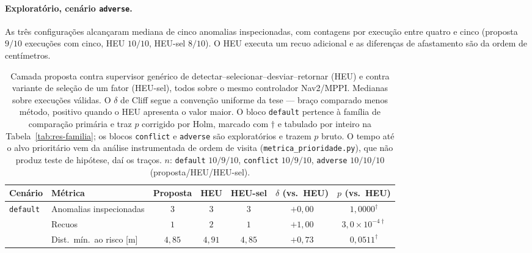 \paragraph*{Exploratório, cenário \texttt{adverse}.}
As três configurações alcançaram mediana de cinco anomalias inspecionadas, com
contagens por execução entre quatro e cinco (proposta $9/10$ execuções com cinco,
HEU $10/10$, HEU-sel $8/10$). O HEU executa um recuo adicional e as diferenças de
afastamento são da ordem de centímetros.

\begin{table}[htb]
\centering
\caption{Camada proposta contra supervisor genérico de
detectar--selecionar--desviar--retornar (HEU) e contra variante de seleção de um
fator (HEU-sel), todos sobre o mesmo controlador Nav2/MPPI. Medianas sobre execuções
válidas. O $\delta$ de Cliff segue a convenção uniforme da tese --- braço comparado
menos método, positivo quando o HEU apresenta o valor maior. O bloco \texttt{default}
pertence à família de comparação primária e traz $p$ corrigido por Holm, marcado com
$\dagger$ e tabulado por inteiro na Tabela~\ref{tab:res-familia}; os blocos
\texttt{conflict} e \texttt{adverse} são exploratórios e trazem $p$ bruto. O tempo
até o alvo prioritário vem da análise instrumentada de ordem de visita
(\texttt{metrica\_prioridade.py}), que não produz teste de hipótese, daí os traços.
$n$: \texttt{default} $10/9/10$, \texttt{conflict} $10/9/10$, \texttt{adverse}
$10/10/10$ (proposta/HEU/HEU-sel).}
\label{tab:res-heu}
\footnotesize
\setlength{\tabcolsep}{4pt}
\begin{tabular}{llccccc}
\hline
\textbf{Cenário} & \textbf{Métrica} & \textbf{Proposta} & \textbf{HEU} &
\textbf{HEU-sel} & \textbf{$\delta$ (vs.\ HEU)} & \textbf{$p$ (vs.\ HEU)}\\
\hline
\texttt{default} & Anomalias inspecionadas    & $3$     & $3$     & $3$     & $+0{,}00$ & $1{,}0000^{\dagger}$\\
                 & Recuos                     & $1$     & $2$     & $1$     & $+1{,}00$ & $3{,}0\times10^{-4\dagger}$\\
                 & Dist.\ mín.\ ao risco [m]  & $4{,}85$  & $4{,}91$  & $4{,}85$  & $+0{,}73$ & $0{,}0511^{\dagger}$\\

\end{tabular}
\end{table}
